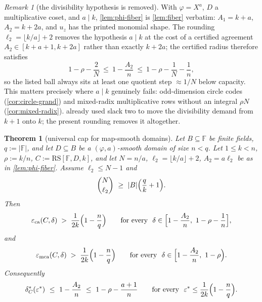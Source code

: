 \documentclass[11pt]{article}
\newtheorem{theorem}{Theorem}[section]
\theoremstyle{definition}
\theoremstyle{remark}
\newtheorem{remark}[remark]{Remark}
\newcommand{\F}{\mathbb{F}}
\newcommand{\B}{B}
\newcommand{\RS}{\mathrm{RS}}
\newcommand{\eca}{\varepsilon_{\mathrm{ca}}}
\newcommand{\emca}{\varepsilon_{\mathrm{mca}}}
\begin{document}
\begin{remark}[the divisibility hypothesis is removed]\label{rem:no-divisibility}
With $\varphi=X^a$, $D$ a multiplicative coset, and $a\mid k$, \cref{lem:phi-fiber} is \cref{lem:fiber} verbatim: $A_1=k+a$, $A_2=k+2a$, and $u_z$ has the printed monomial shape. The rounding $\ell_2=\lfloor k/a\rfloor+2$ removes the hypothesis $a\mid k$ at the cost of a certified agreement $A_2\in[k+a+1,k+2a]$ rather than exactly $k+2a$; the certified radius therefore satisfies
\[
1-\rho-\frac2N\ \le\ 1-\frac{A_2}n\ \le\ 1-\rho-\frac1N-\frac1n,
\]
so the listed ball always sits at least one quotient step $\approx1/N$ below capacity. This matters precisely where $a\mid k$ genuinely fails: odd-dimension circle codes (\cref{cor:circle-grand}) and mixed-radix multiplicative rows without an integral $\rho N$ (\cref{cor:mixed-radix}).  already used slack two to move the divisibility demand from $k+1$ onto $k$; the present rounding removes it altogether.
\end{remark}

\begin{theorem}[universal cap for map-smooth domains]\label{thm:phi-cap}
Let $\B\subseteq\F$ be finite fields, $q:=|\F|$, and let $D\subseteq\B$ be a $(\varphi,a)$-smooth domain of size $n<q$. Let $1\le k<n$, $\rho:=k/n$, $C:=\RS[\F,D,k]$, and let $N=n/a$, $\ell_2=\lfloor k/a\rfloor+2$, $A_2=a\ell_2$ be as in \cref{lem:phi-fiber}. Assume $\ell_2\le N-1$ and
\begin{equation}\label{eq:hyp-phi}
\binom N{\ell_2}\ \ge\ |\B|\Bigl(\frac qk+1\Bigr).
\end{equation}
Then
\[
\eca(C,\delta)\;>\;\frac1{2k}\Bigl(1-\frac nq\Bigr)
\qquad\text{for every }\ \delta\in\Bigl[1-\frac{A_2}n,\ 1-\rho-\frac1n\Bigr],
\]
and
\[
\emca(C,\delta)\;>\;\frac1{2k}\Bigl(1-\frac nq\Bigr)
\qquad\text{for every }\ \delta\in\Bigl[1-\frac{A_2}n,\ 1-\rho\Bigr).
\]
Consequently
\[
\delta^*_C(\varepsilon^*)\ \le\ 1-\frac{A_2}n\ \le\ 1-\rho-\frac{a+1}n
\qquad\text{for every }\ \varepsilon^*\le\frac1{2k}\Bigl(1-\frac nq\Bigr).
\]
\end{theorem}
\end{document}
